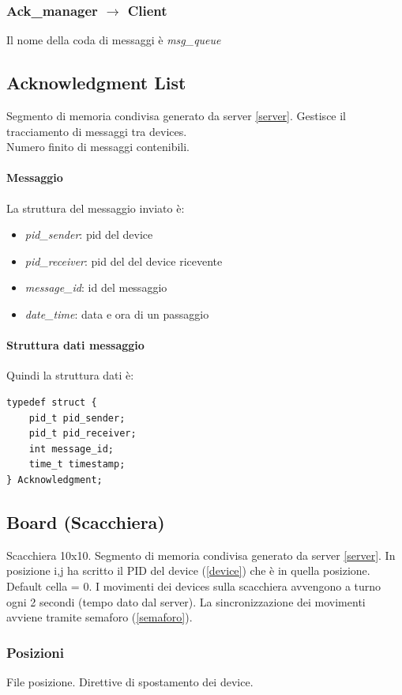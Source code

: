 \documentclass[10pt,a4paper]{article}
\begin{document}
{\subsubsection{Ack\_manager $\rightarrow$ Client} \label{AckManagerClient}
Il nome della coda di messaggi è \emph{msg\_queue}

\subsection{Acknowledgment List} \label{acknowledgement}
Segmento di memoria condivisa generato da server \ref{server}. Gestisce il tracciamento di messaggi tra devices. 
\\Numero finito di messaggi contenibili.
\paragraph{Messaggio} 
La struttura del messaggio inviato è:
\begin{itemize}
\item \emph{pid\_sender}: pid del device
\item \emph{pid\_receiver}: pid del del device ricevente
\item \emph{message\_id}: id del messaggio
\item \emph{date\_time}: data e ora di un passaggio
\end{itemize}
\paragraph{Struttura dati messaggio}
Quindi la struttura dati è:
\begin{Verbatim}
typedef struct {
	pid_t pid_sender;
	pid_t pid_receiver;
	int message_id;
	time_t timestamp;
} Acknowledgment;
\end{Verbatim}

\subsection{Board (Scacchiera)} \label{board}
Scacchiera 10x10. Segmento di memoria condivisa generato da server \ref{server}. In posizione i,j ha scritto il PID del device (\ref{device}) che è in quella posizione. Default cella = 0. I movimenti dei devices sulla scacchiera avvengono a turno ogni 2 secondi (tempo dato dal server). La sincronizzazione dei movimenti avviene tramite semaforo (\ref{semaforo}).
\subsubsection{Posizioni}
File posizione. Direttive di spostamento dei device.
}
\end{document}
